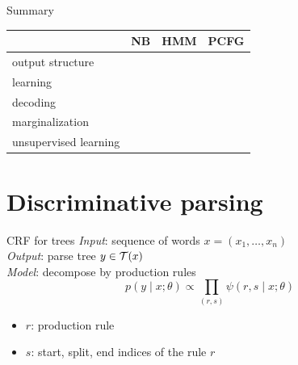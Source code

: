 \documentclass[usenames,dvipsnames,notes]{beamer}
\begin{document}
\begin{frame}
    {Summary}
    \begin{table}
        \renewcommand{\arraystretch}{1.7}
        \begin{tabular}{p{3cm}p{2cm}p{2cm}p{2cm}}
            \toprule
            & NB & HMM & PCFG \\
            \midrule
            output structure & & & \\
            learning & & & \\
            decoding & & & \\
            marginalization & & & \\
            unsupervised learning & & & \\
            \bottomrule
        \end{tabular}
    \end{table}
\end{frame}

\section{Discriminative parsing}

\begin{frame}
    {CRF for trees}
    \emph{Input}: sequence of words $x=(x_1, \ldots, x_n)$\\
    \emph{Output}: parse tree $y\in\mathcal{T}(x)$\\
    \emph{Model}: decompose by production rules 
    $$
    p(y\mid x;\theta) \propto \prod_{(r,s)} \psi(r, s\mid x; \theta)
    $$
    \vspace{-1em}
    \begin{itemize}
        \item $r$: production rule
        \item $s$: start, split, end indices of the rule $r$
    \end{itemize}
    
\end{frame}
\end{document}
